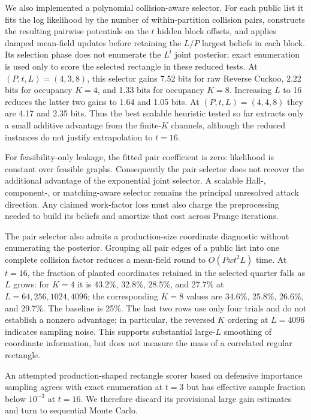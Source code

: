We also implemented a polynomial collision-aware selector.  For each public
list it fits the log likelihood by the number of within-partition collision
pairs, constructs the resulting pairwise potentials on the $t$ hidden block
offsets, and applies damped mean-field updates before retaining the $L/P$
largest beliefs in each block.  Its selection phase does not enumerate the
$L^t$ joint posterior; exact enumeration is used only to score the selected
rectangle in these reduced tests.  At $(P,t,L)=(4,3,8)$, this selector gains
7.52 bits for raw Reverse Cuckoo, 2.22 bits for occupancy $K=4$, and 1.33 bits
for occupancy $K=8$.  Increasing $L$ to 16 reduces the latter two gains to
1.64 and 1.05 bits.  At $(P,t,L)=(4,4,8)$ they are 4.17 and 2.35 bits.  Thus
the best scalable heuristic tested so far extracts only a small additive
advantage from the finite-$K$ channels, although the reduced instances do not
justify extrapolation to $t=16$.

For feasibility-only leakage, the fitted pair coefficient is zero: likelihood
is constant over feasible graphs.  Consequently the pair selector does not
recover the additional advantage of the exponential joint selector.  A
scalable Hall-, component-, or matching-aware selector remains the principal
unresolved attack direction.  Any claimed work-factor loss must also charge
the preprocessing needed to build its beliefs and amortize that cost across
Prange iterations.

The pair selector also admits a production-size coordinate diagnostic without
enumerating the posterior.  Grouping all pair edges of a public list into one
complete collision factor reduces a mean-field round to $O(Pwt^2L)$ time.  At
$t=16$, the fraction of planted coordinates retained in the selected quarter
falls as $L$ grows: for $K=4$ it is 43.2\%, 32.8\%, 28.5\%, and 27.7\% at
$L=64,256,1024,4096$; the corresponding $K=8$ values are 34.6\%, 25.8\%,
26.6\%, and 29.7\%.  The baseline is 25\%.  The last two rows use only four
trials and do not establish a nonzero advantage; in particular, the reversed
$K$ ordering at $L=4096$ indicates sampling noise.  This supports substantial
large-$L$ smoothing of coordinate information, but does not measure the mass
of a correlated regular rectangle.

An attempted production-shaped rectangle scorer based on defensive importance
sampling agrees with exact enumeration at $t=3$ but has effective sample
fraction below $10^{-3}$ at $t=16$.  We therefore discard its provisional
large gain estimates and turn to sequential Monte Carlo.

